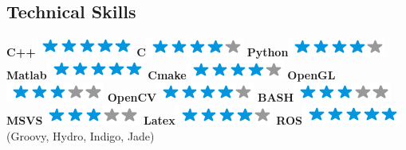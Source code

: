 \documentclass[]{friggeri-cv}
\begin{document}
\begin{aside}
  \section{Technical Skills}
    \textbf{C++}\includegraphics[scale=0.40]{img/5stars.png}
    \textbf{C}\includegraphics[scale=0.40]{img/4stars.png}
    \textbf{Python}\includegraphics[scale=0.40]{img/4stars.png}
    \textbf{Matlab}\includegraphics[scale=0.40]{img/5stars.png}
    \textbf{Cmake}\includegraphics[scale=0.40]{img/4stars.png}
    \textbf{OpenGL}\includegraphics[scale=0.40]{img/3stars.png}
    \textbf{OpenCV}\includegraphics[scale=0.40]{img/4stars.png}
    \textbf{BASH}\includegraphics[scale=0.40]{img/3stars.png}
    \textbf{MSVS}\includegraphics[scale=0.40]{img/3stars.png}
    \textbf{Latex}\includegraphics[scale=0.40]{img/4stars.png}
    \textbf{ROS}\includegraphics[scale=0.40]{img/5stars.png}\\ \scriptsize{(Groovy, Hydro, Indigo, Jade)}
    ~
\end{aside}
\end{document}
